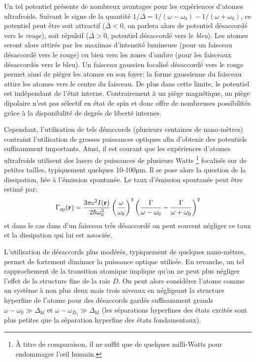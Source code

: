 Un tel potentiel présente de nombreux avantages pour les expériences d'atomes ultrafroids. Suivant le signe de la quantité $1/\overline{\Delta} = 1/(\omega-\omega_0)-1/(\omega+\omega_0)$, ce potentiel peut être soit attractif ($\overline{\Delta}<0$, on parlera alors de potentiel désaccordé vers le \emph{rouge}), soit répulsif ($\overline{\Delta}>0$, potentiel désaccordé vers le \emph{bleu}). Les atomes seront alors attirés par les maximas d'intensité lumineuse (pour un faisceau désaccordé vers le rouge) ou bien vers les zones d'ombre (pour les faisceaux désaccordés vers le bleu). Un faisceau gaussien focalisé désaccordé vers le rouge permet ainsi de piéger les atomes en son foyer: la forme gaussienne du faisceau attire les atomes vers le centre du faisceau. De plus dans cette limite, le potentiel est indépendant de l'état interne. Contrairement à un piège magnétique, un piège dipolaire n'est pas sélectif en état de spin et donc offre de nombreuses possibilités grâce à la disponibilité de degrés de liberté internes.

Cependant, l'utilisation de tels désaccords (plusieurs centaines de nano-mètres) contraint l'utilisation de grosses puissances optiques afin d'obtenir des potentiels suffisamment importants. Ainsi, il est courant que les expériences d'atomes ultrafroids utilisent des lasers de puissances de plusieurs Watts \footnote{À titre de comparaison, il ne suffit que de quelques milli-Watts pour endommager l'œil humain.} focalisés sur de petites tailles, typiquement quelques 10-100µm. Il se pose alors la question de la dissipation, liée à l'émission spontanée. Le taux d'émission spontanée peut être estimé par:
\begin{equation}
\Gamma_{\mathrm{sp}}(\mathbf{r})=\frac{3 \pi c^2 I(\mathbf{r})}{2\hslash \omega_0^3} \left( \frac{\omega}{\omega_0}\right)^3 \left( \frac{\Gamma}{\omega-\omega_0}-\frac{\Gamma}{\omega+\omega_0} \right)^2
\end{equation}
et dans le cas dans d'un faisceau très désaccordé on peut souvent négliger ce taux et la dissipation qui lui est associée.

L'utilisation de désaccords plus modérés, typiquement de quelques nano-mètres, permet de fortement diminuer la puissance optique utilisée. En revanche, un tel rapprochement de la transition atomique implique qu'on ne peut plus négliger l'effet de la structure fine de la raie $D$. On peut alors considérer l'atome comme un système à non plus deux mais trois niveaux en négligeant la structure hyperfine de l'atome pour des désaccords gardés suffisamment grands $\omega-\omega_0 \gg \Delta_{\mathrm{hf}}$ et $\omega-\omega_{D_1} \gg \Delta_{\mathrm{hf}}$ (les séparations hyperfines des états excités sont plus petites que la séparation hyperfine des états fondamentaux).

